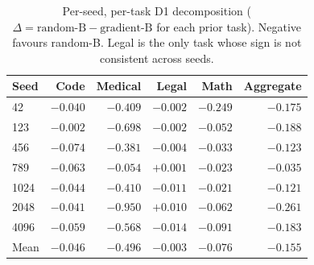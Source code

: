 
\begin{table}[h]
\caption{Per-seed, per-task D1 decomposition ($\Delta = \text{random-B} - \text{gradient-B}$ for each prior task). Negative favours random-B. Legal is the only task whose sign is not consistent across seeds.}
\label{tab:d1_per_task_seeds}
\centering
\small
\begin{tabular}{@{}lrrrrr@{}}
\toprule
\textbf{Seed} & \textbf{Code} & \textbf{Medical} & \textbf{Legal} & \textbf{Math} & \textbf{Aggregate} \\
\midrule
42   & $-0.040$ & $-0.409$ & $-0.002$ & $-0.249$ & $-0.175$ \\
123  & $-0.002$ & $-0.698$ & $-0.002$ & $-0.052$ & $-0.188$ \\
456  & $-0.074$ & $-0.381$ & $-0.004$ & $-0.033$ & $-0.123$ \\
789  & $-0.063$ & $-0.054$ & $+0.001$ & $-0.023$ & $-0.035$ \\
1024 & $-0.044$ & $-0.410$ & $-0.011$ & $-0.021$ & $-0.121$ \\
2048 & $-0.041$ & $-0.950$ & $+0.010$ & $-0.062$ & $-0.261$ \\
4096 & $-0.059$ & $-0.568$ & $-0.014$ & $-0.091$ & $-0.183$ \\
\midrule
Mean & $-0.046$ & $-0.496$ & $-0.003$ & $-0.076$ & $-0.155$ \\
\bottomrule
\end{tabular}
\end{table}

